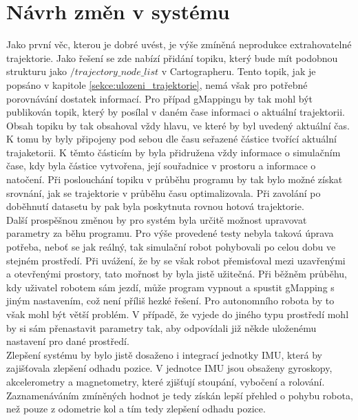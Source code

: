 \documentclass[12pt]{report}
\begin{document}
\section{Návrh změn v systému} \label{kapitola:navrh zmen}
Jako první věc, kterou je dobré uvést, je výše zmíněná neprodukce extrahovatelné trajektorie. Jako řešení se zde nabízí přidání topiku, který bude mít podobnou strukturu jako $/trajectory\_node\_list$ v Cartographeru. Tento topik, jak je popsáno v kapitole \ref{sekce:ulozeni_trajektorie}, nemá však pro potřebné porovnávání dostatek informací. Pro případ gMappingu by tak mohl být publikován topik, který by posílal v daném čase informaci o aktuální trajektorii. Obsah topiku by tak obsahoval vždy hlavu, ve které by byl uvedený aktuální čas. K tomu by byly připojeny pod sebou dle času seřazené částice tvořící aktuální trajaketorii. K těmto částicím by byla přidružena vždy informace o simulačním čase, kdy byla částice vytvořena, její souřadnice v prostoru a informace o natočení. Při poslouchání topiku v průběhu programu by tak bylo možné získat srovnání, jak se trajektorie v průběhu času optimalizovala. Při zavolání po doběhnutí datasetu by pak byla poskytnuta rovnou hotová trajektorie.\\
\indent Další prospěšnou změnou by pro systém byla určitě možnost upravovat parametry za běhu programu. Pro výše provedené testy nebyla taková úprava potřeba, neboť se jak reálný, tak simulační robot pohybovali po celou dobu ve stejném prostředí. Při uvážení, že by se však robot přemisťoval mezi uzavřenými a otevřenými prostory, tato mořnost by byla jistě užitečná. Při běžněm průběhu, kdy uživatel robotem sám jezdí, může program vypnout a spustit gMapping s jiným nastavením, což není příliš hezké řešení. Pro autonomního robota by to však mohl být větší problém. V případě, že vyjede do jiného typu prostředí mohl by si sám přenastavit parametry tak, aby odpovídali již někde uloženému nastavení pro dané prostředí.\\
\indent Zlepšení systému by bylo jistě dosaženo i integrací jednotky IMU, která by zajišťovala zlepšení odhadu pozice. V jednotce IMU jsou obsaženy gyroskopy, akcelerometry a magnetometry, které zjišťují stoupání, vybočení a rolování. Zaznamenáváním zmíněných hodnot je tedy získán lepší přehled o pohybu robota, než pouze z odometrie kol a tím tedy zlepšení odhadu pozice.\\
\end{document}
